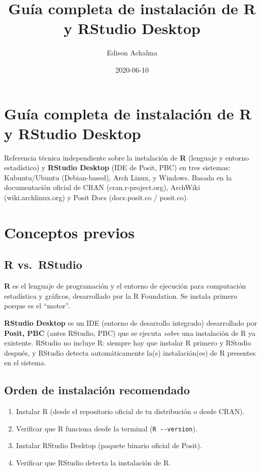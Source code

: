 \documentclass[
  man,
  floatsintext,
  longtable,
  a4paper,
  nolmodern,
  notxfonts,
  notimes,
  12pt,
  colorlinks=true,linkcolor=blue,citecolor=blue,urlcolor=blue]{apa7}
\title{Guía completa de instalación de R y RStudio Desktop}
\author{Edison Achalma}
\affiliation{
{Escuela Profesional de Economía, Universidad Nacional de San Cristóbal
de Huamanga}}
\date{2020-06-10}
\providecommand{\tightlist}{%
  \setlength{\itemsep}{0pt}\setlength{\parskip}{0pt}}
\begin{document}
\maketitle


\hypertarget{toc}{}
\tableofcontents
\newpage
\section[Introduction]{Guía completa de instalación de R y RStudio
Desktop}

\setcounter{secnumdepth}{3}

\setlength\LTleft{0pt}




Referencia técnica independiente sobre la instalación de \textbf{R}
(lenguaje y entorno estadístico) y \textbf{RStudio Desktop} (IDE de
Posit, PBC) en tres sistemas: Kubuntu/Ubuntu (Debian-based), Arch Linux,
y Windows. Basada en la documentación oficial de CRAN
(cran.r-project.org), ArchWiki (wiki.archlinux.org) y Posit Docs
(docs.posit.co / posit.co).

\section{Conceptos previos}\label{conceptos-previos}

\subsection{R vs.~RStudio}\label{r-vs.-rstudio}

\textbf{R} es el lenguaje de programación y el entorno de ejecución para
computación estadística y gráficos, desarrollado por la R Foundation. Se
instala primero porque es el ``motor''.

\textbf{RStudio Desktop} es un IDE (entorno de desarrollo integrado)
desarrollado por \textbf{Posit, PBC} (antes RStudio, PBC) que se ejecuta
\emph{sobre} una instalación de R ya existente. RStudio no incluye R:
siempre hay que instalar R primero y RStudio después, y RStudio detecta
automáticamente la(s) instalación(es) de R presentes en el sistema.

\subsection{Orden de instalación
recomendado}\label{orden-de-instalaciuxf3n-recomendado}

\begin{enumerate}
\def\labelenumi{\arabic{enumi}.}
\tightlist
\item
  Instalar R (desde el repositorio oficial de tu distribución o desde
  CRAN).
\item
  Verificar que R funciona desde la terminal (\texttt{R\ -\/-version}).
\item
  Instalar RStudio Desktop (paquete binario oficial de Posit).
\item
  Verificar que RStudio detecta la instalación de R.
\end{enumerate}
\end{document}
